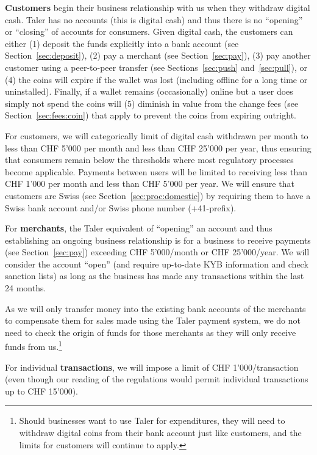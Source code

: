 \documentclass[10pt,a4paper,oneside]{book}
\begin{document}
{\bf Customers} begin their business relationship with us when they withdraw
digital cash.  Taler has no accounts (this is digital cash) and thus there is
no ``opening'' or ``closing'' of accounts for consumers.  Given digital cash,
the customers can either (1) deposit the funds explicitly into a bank account
(see Section~\ref{sec:deposit}), (2) pay a merchant (see
Section~\ref{sec:pay}), (3) pay another customer using a peer-to-peer
transfer (see Sections~\ref{sec:push} and~\ref{sec:pull}), or (4) the coins
will expire if the wallet was lost (including offline for a long time or
uninstalled).  Finally, if a wallet remains (occasionally) online but a user
does simply not spend the coins will (5) diminish in value from the change
fees (see Section~\ref{sec:fees:coin}) that apply to prevent the coins from
expiring outright.

For customers, we will categorically limit of digital cash withdrawn per month
to less than CHF 5'000 per month and less than CHF 25'000 per year, thus
ensuring that consumers remain below the thresholds where most regulatory
processes become applicable.  Payments between users will be limited
to receiving less than CHF 1'000 per month and less than CHF 5'000 per year.
We will ensure that customers are Swiss
(see Section~\ref{sec:proc:domestic}) by requiring them to have a Swiss bank
account and/or Swiss phone number (+41-prefix).

For {\bf merchants}, the Taler equivalent of ``opening'' an account and thus
establishing an ongoing business relationship is for a business to receive
payments (see Section~\ref{sec:pay}) exceeding CHF 5'000/month or CHF
25'000/year.  We will consider the account ``open'' (and require up-to-date KYB
information and check sanction lists) as long as the business has made any
transactions within the last 24 months.

As we will only transfer money into the existing bank accounts of the
merchants to compensate them for sales made using the Taler payment system, we
do not need to check the origin of funds for those merchants as they will only
receive funds from us.\footnote{Should businesses want to use Taler for
expenditures, they will need to withdraw digital coins from their bank account
just like customers, and the limits for customers will continue to apply.}

For individual {\bf transactions}, we will impose a limit of CHF
1'000/transaction (even though our reading of the regulations would permit
individual transactions up to CHF 15'000).
\end{document}
